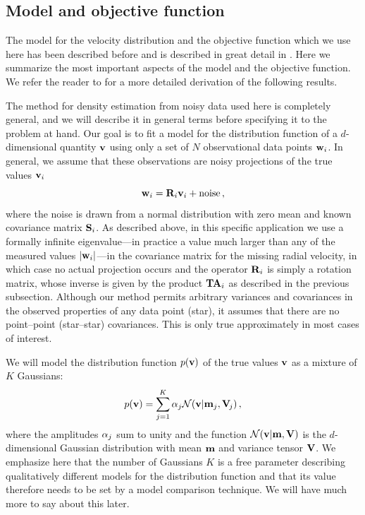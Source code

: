 \subsection{Model and objective function}

The model for the velocity distribution and the objective function
which we use here has been described before
\citep{2005ApJ...629..268H} and is described in great detail in
\citet{BovyXD}. Here we summarize the most important aspects of the
model and the objective function. We refer the reader to
\citet{BovyXD} for a more detailed derivation of the following
results.

The method for density estimation from noisy data used here is
completely general, and we will describe it in general terms before
specifying it to the problem at hand. Our goal is to fit a model for
the distribution function of a $d$-dimensional quantity $\boldsymbol{\mathbf{v}}$ using
only a set of $N$ observational data points $\mathbf{w}_i$. In general, we
assume that these observations are noisy projections of the true
values $\boldsymbol{\mathbf{v}}_i$
\begin{equation}
\mathbf{w}_i = \mathbf{R}_i \boldsymbol{\mathbf{v}}_i + \mbox{noise}\, ,
\end{equation}
where the noise is drawn from a normal distribution with zero mean and
known covariance matrix $\mathbf{S}_i$. As described above, in this specific
application we use a formally infinite eigenvalue---in practice a
value much larger than any of the measured values $|\mathbf{w}_i|$---in the
covariance matrix for the missing radial velocity, in which case no
actual projection occurs and the operator $\mathbf{R}_i$ is simply a rotation
matrix, whose inverse is given by the product $\mathbf{T}\mathbf{A}_i$ as described
in the previous subsection. Although our method permits arbitrary
variances and covariances in the observed properties of any data point
(star), it assumes that there are no point--point (star--star)
covariances. This is only true approximately in most cases of
interest.

We will model the distribution function $p(\boldsymbol{\mathbf{v}})$ of the true values
$\boldsymbol{\mathbf{v}}$ as a mixture of $K$ Gaussians:
\begin{equation}
p(\boldsymbol{\mathbf{v}}) = \sum_{j=1}^K \alpha_j \mathcal{N}(\boldsymbol{\mathbf{v}}|\mathbf{m}_j,\mathbf{V}_{\!j})\, ,
\end{equation}
where the amplitudes $\alpha_j$ sum to unity and the function
$\mathcal{N}(\boldsymbol{\mathbf{v}}|\mathbf{m},\mathbf{V})$ is the $d$-dimensional Gaussian distribution
with mean $\mathbf{m}$ and variance tensor $\mathbf{V}$. We emphasize here that the
number of Gaussians $K$ is a free parameter describing qualitatively
different models for the distribution function and that its value
therefore needs to be set by a model comparison technique. We will
have much more to say about this later.

